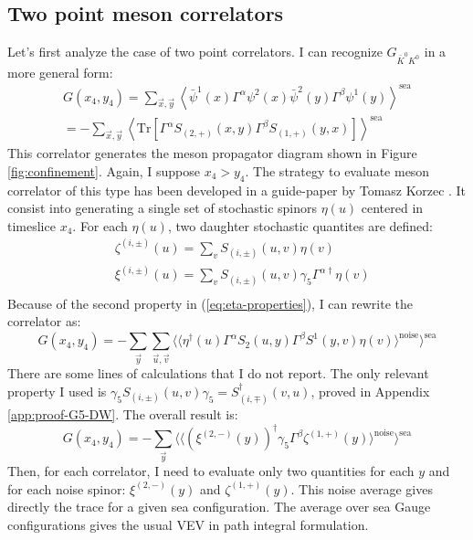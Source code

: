 \documentclass[english, LaM, oneside, noexaminfo]{sapthesis}
\newcommand{\la}{\langle}
\newcommand{\ra}{\rangle}
\newcommand{\tr}{\text{Tr}}
\begin{document}
\subsection*{Two point meson correlators}
\noindent
Let's first analyze the case of two point correlators.
I can recognize $G_{\bar K^0 K^0}$ in a more general form:
\begin{equation}\label{eq:2pts-correlator-prototype}
    \begin{gathered}
        G(x_4,y_4) = \sum_{\vec x, \vec y} \left\la \bar\psi^1 (x) \Gamma^\alpha \psi^2 (x) \bar\psi^2 (y) \Gamma^\beta \psi^1 (y) \right\ra^\text{sea} \\
        = -  \sum_{\vec x, \vec y} \left\la \tr \left[ \Gamma^\alpha S_{(2,+)} (x,y) \Gamma^\beta S_{(1,+)} (y,x) \right] \right\ra^\text{sea}
    \end{gathered}
\end{equation}
This correlator generates the meson propagator diagram shown in Figure \ref{fig:confinement}.
Again, I suppose $x_4 > y_4$.
The strategy to evaluate meson correlator of this type has been developed in a guide-paper by Tomasz Korzec \cite{korzec}.
It consist into generating a single set of stochastic spinors $\eta (u)$ centered in timeslice $x_4$.
For each $\eta (u)$, two daughter stochastic quantites are defined:
\begin{equation*}
    \begin{split}
        & \zeta^{(i,\pm)} (u) = \sum_v S_{(i,\pm)}(u,v) \eta (v) \\
        & \xi^{(i,\pm)} (u) = \sum_v S_{(i,\pm)}(u,v) \gamma_5 \Gamma^{\alpha\dag} \eta (v) \\
    \end{split}
\end{equation*}
Because of the second property in (\ref{eq:eta-properties}), I can rewrite the correlator as:
\begin{equation*}
    G(x_4,y_4) = -\sum_{\vec y} \sum_{\vec u, \vec v}  \bigg\langle \Big\langle \eta^\dag(u) \Gamma^\alpha S_2 (u,y) \Gamma^\beta S^1 (y,v) \eta(v) \Big\rangle^\text{noise} \bigg\rangle^{\text{sea}} 
\end{equation*}
There are some lines of calculations that I do not report.
The only relevant property I used is $\gamma_5 S_{(i,\pm)} (u,v) \gamma_5 = S_{(i,\mp)}^\dag (v,u)$, proved in Appendix \ref{app:proof-G5-DW}.
The overall result is:
\begin{equation*}
    G(x_4,y_4) = -\sum_{\vec y} \Bigg\langle \bigg\langle \left(\xi^{(2,-)}(y)\right)^\dag \gamma_5 \Gamma^\beta \zeta^{(1,+)}(y) \bigg\rangle^\text{noise} \Bigg\rangle^{\text{sea}} 
\end{equation*}
Then, for each correlator, I need to evaluate only two quantities for each $y$ and for each noise spinor: $\xi^{(2,-)}(y)$ and $\zeta^{(1,+)}(y)$.
This noise average gives directly the trace for a given sea configuration.
The average over sea Gauge configurations gives the usual VEV in path integral formulation.
\end{document}
